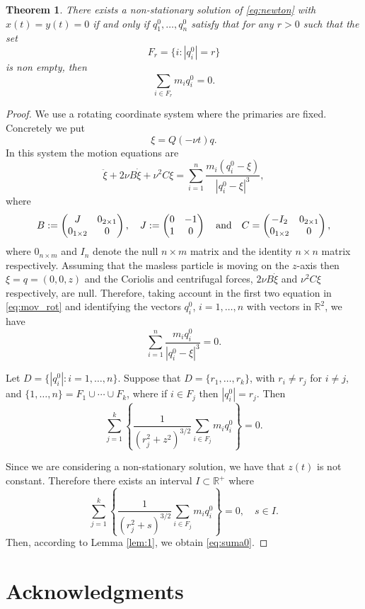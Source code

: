 \documentclass[twoside]{article}
\newtheorem{thm}{Theorem}[section]
\theoremstyle{remark}
\newcommand{\rr}{\mathbb{R}}
\begin{document}
\begin{thm} There exists a non-stationary  solution of \eqref{eq:newton} with $x(t)=y(t)=0$ if and only if $q^0_1,\ldots,q^ 0_n$ satisfy that for any $r>0$ such that the set
\[F_r=\{i:|q_i^ 0|=r\}\]
is non empty, then
\begin{equation}\label{eq:suma0}\sum_{i\in F_r}m_iq_i^ 0=0.\end{equation}
\end{thm}

\begin{proof} We use a rotating coordinate system where the primaries are fixed. Concretely we  put
\[\xi=Q(-\nu t)q.\]
In this system the motion equations are
\begin{equation}\label{eq:mov_rot}\ddot{\xi}+2\nu B\dot{\xi}+\nu^2 C\xi=\sum_{i=1}^n\frac{m_i(q_i^0-\xi)}{|q_i^0-\xi|^3},\end{equation}
where
\[B:=\begin{pmatrix}
       J & 0_{2\times 1}\\
       0_{1\times 2} & 0\\
     \end{pmatrix},\quad J:=\begin{pmatrix}
       0 & -1\\
       1 & 0\\
     \end{pmatrix}\quad\hbox{and}\quad C=\begin{pmatrix}
       -I_{2} & 0_{2\times 1}\\
       0_{1\times 2} & 0\\
     \end{pmatrix},
\]
where $0_{n\times m}$ and $I_{n}$ denote the null $n\times m$ matrix  and the identity $n\times n$ matrix respectively. Assuming that the masless particle is moving on the $z$-axis then $\xi=q=(0,0,z)$ and the Coriolis and centrifugal forces,   $2\nu B\dot{\xi}$ and $\nu^2 C\xi$ respectively, are null. Therefore, taking account in the first two equation in \eqref{eq:mov_rot} and identifying the vectors $q_i^0$, $i=1,\ldots,n$ with vectors in $\rr^2$, we have
\[
\sum_{i=1}^n\frac{m_iq_i^0}{|q_i^0-\xi|^3}=0.
\]

Let $D=\{|q_i^0|: i=1,\ldots,n\}$.  Suppose that $D=\{r_1,\ldots,r_k\}$, with $r_i\neq r_j$ for $i\neq j$, and  $\{1,\ldots,n\}=F_1\cup \cdots\cup F_k$, where if $i\in F_j$ then $|q_i^0|=r_j$. Then
\[\sum_{j=1}^k\left\{\frac{1}{(r_j^{2}+z^2)^{3/2}}\sum_{i\in F_j}m_iq_i^0\right\}=0.\]

Since we are considering a non-stationary solution, we have that $z(t)$ is not constant. Therefore there exists an interval $I\subset\rr^+$ where
\[\sum_{j=1}^k\left\{\frac{1}{(r_j^{2}+s)^{3/2}}\sum_{i\in F_j}m_iq_i^0\right\}=0,\quad s\in I.\]
Then, according to Lemma \ref{lem:1}, we obtain \eqref{eq:suma0}.
\end{proof}







\section*{Acknowledgments}




 
\end{document}

